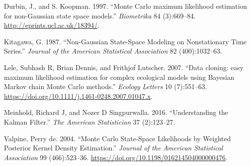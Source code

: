 \documentclass[]{article}
\begin{document}
\leavevmode\hypertarget{ref-Durbin1997}{}%
Durbin, J., and S. Koopman. 1997. ``Monte Carlo maximum likelihood
estimation for non-Gaussian state space models.'' \emph{Biometrika} 84
(3):669--84. \url{http://eprints.ucl.ac.uk/18394/}.

\leavevmode\hypertarget{ref-Kitagawa1987}{}%
Kitagawa, G. 1987. ``Non-Gaussian State-Space Modeling on Nonstationary
Time Series.'' \emph{Journal of the American Statistical Association} 82
(400):1032--63.

\leavevmode\hypertarget{ref-Lele2007}{}%
Lele, Subhash R, Brian Dennis, and Frithjof Lutscher. 2007. ``Data
cloning: easy maximum likelihood estimation for complex ecological
models using Bayesian Markov chain Monte Carlo methods.'' \emph{Ecology
Letters} 10 (7):551--63.
\url{https://doi.org/10.1111/j.1461-0248.2007.01047.x}.

\leavevmode\hypertarget{ref-Meinhold2016}{}%
Meinhold, Richard J, and Nozer D Singpurwalla. 2016. ``Understanding the
Kalman Filter.'' \emph{The American Statistician} 37 (2):123--27.

\leavevmode\hypertarget{ref-DeValpine2004}{}%
Valpine, Perry de. 2004. ``Monte Carlo State-Space Likelihoods by
Weighted Posterior Kernel Density Estimation.'' \emph{Journal of the
American Statistical Association} 99 (466):523--36.
\url{https://doi.org/10.1198/016214504000000476}.
\end{document}
